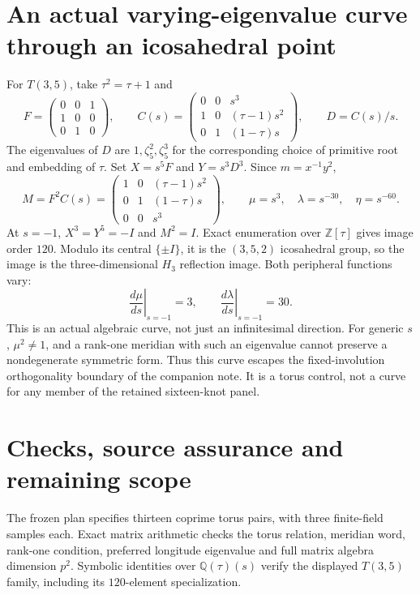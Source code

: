 \documentclass[11pt]{article}
\begin{document}
\section{An actual varying-eigenvalue curve through an icosahedral point}

For $T(3,5)$, take $\tau^2=\tau+1$ and
\[
 F=\begin{pmatrix}0&0&1\\1&0&0\\0&1&0\end{pmatrix},\qquad
 C(s)=\begin{pmatrix}
 0&0&s^3\\1&0&(\tau-1)s^2\\0&1&(1-\tau)s
 \end{pmatrix},\qquad D=C(s)/s.
\]
The eigenvalues of $D$ are $1,\zeta_5^2,\zeta_5^3$ for the
corresponding choice of primitive root and embedding of $\tau$.
Set $X=s^5F$ and $Y=s^3D^3$. Since $m=x^{-1}y^2$,
\[
 M=F^2C(s)=\begin{pmatrix}
 1&0&(\tau-1)s^2\\0&1&(1-\tau)s\\0&0&s^3
 \end{pmatrix},\qquad
 \mu=s^3,\quad\lambda=s^{-30},\quad\eta=s^{-60}.
\]
At $s=-1$, $X^3=Y^5=-I$ and $M^2=I$. Exact enumeration over
$\mathbb Z[\tau]$ gives image order $120$. Modulo its central
$\{\pm I\}$, it is the $(3,5,2)$ icosahedral group, so the image
is the three-dimensional $H_3$ reflection image.
Both peripheral functions vary:
\[
 \left.\frac{d\mu}{ds}\right|_{s=-1}=3,
 \qquad \left.\frac{d\lambda}{ds}\right|_{s=-1}=30.
\]
This is an actual algebraic curve, not just an infinitesimal
direction. For generic $s$, $\mu^2\ne1$, and a rank-one meridian
with such an eigenvalue cannot preserve a nondegenerate symmetric
form. Thus this curve escapes the fixed-involution orthogonality
boundary of the companion note. It is a torus control, not a curve
for any member of the retained sixteen-knot panel.

\section{Checks, source assurance and remaining scope}

The frozen plan  specifies thirteen
coprime torus pairs, with three finite-field samples each. Exact
matrix arithmetic checks the torus relation, meridian word,
rank-one condition, preferred longitude eigenvalue and full matrix
algebra dimension $p^2$. Symbolic identities over
$\mathbb Q(\tau)(s)$ verify the displayed $T(3,5)$ family, including
its $120$-element specialization.
\end{document}
